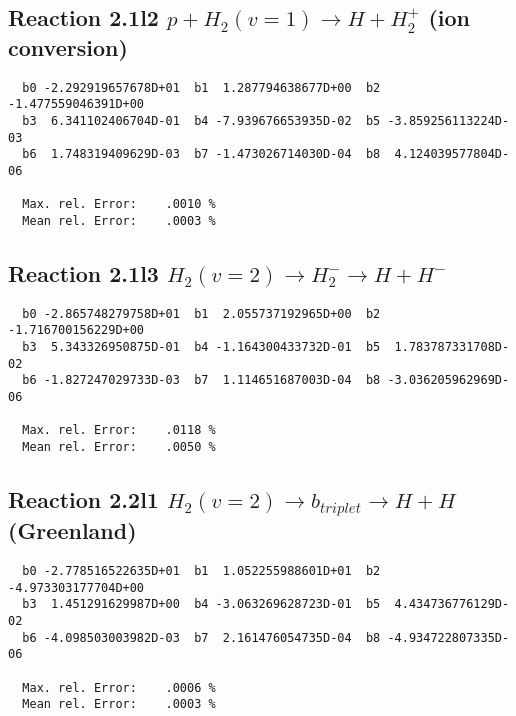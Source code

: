 \documentclass[12pt]{article}
\begin{document}
\subsection{
Reaction 2.1l2
$ p + H_2(v=1) \rightarrow H + H_2^+$ (ion conversion)
}


\begin{small}\begin{verbatim}
  b0 -2.292919657678D+01  b1  1.287794638677D+00  b2 -1.477559046391D+00
  b3  6.341102406704D-01  b4 -7.939676653935D-02  b5 -3.859256113224D-03
  b6  1.748319409629D-03  b7 -1.473026714030D-04  b8  4.124039577804D-06

  Max. rel. Error:    .0010 %
  Mean rel. Error:    .0003 %
\end{verbatim}\end{small}


\subsection{
Reaction 2.1l3
 $ H_2(v=2) \rightarrow H_2^- \rightarrow H + H^-$
}


\begin{small}\begin{verbatim}
  b0 -2.865748279758D+01  b1  2.055737192965D+00  b2 -1.716700156229D+00
  b3  5.343326950875D-01  b4 -1.164300433732D-01  b5  1.783787331708D-02
  b6 -1.827247029733D-03  b7  1.114651687003D-04  b8 -3.036205962969D-06

  Max. rel. Error:    .0118 %
  Mean rel. Error:    .0050 %
\end{verbatim}\end{small}

\newpage
\subsection{
Reaction 2.2l1
$ H_2(v=2) \rightarrow b_{triplet}\rightarrow H + H $ (Greenland) 
}


\begin{small}\begin{verbatim}
  b0 -2.778516522635D+01  b1  1.052255988601D+01  b2 -4.973303177704D+00
  b3  1.451291629987D+00  b4 -3.063269628723D-01  b5  4.434736776129D-02
  b6 -4.098503003982D-03  b7  2.161476054735D-04  b8 -4.934722807335D-06

  Max. rel. Error:    .0006 %
  Mean rel. Error:    .0003 %
\end{verbatim}\end{small}
\end{document}
